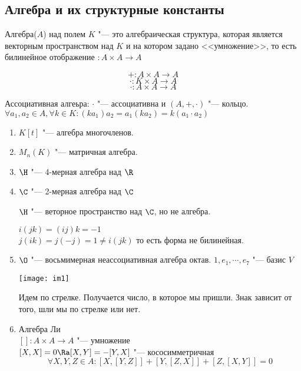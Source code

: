 \subsection{Алгебра и их структурные константы}
\begin{Def}
Алгебра($A$) над полем $K$ "--- это алгебраическая  структура, которая является векторным пространством
над $K$ и на котором задано <<умножение>>, то есть билинейное отображение $\colon A \times A \to A$

$$+ \colon A \times A \to A$$
$$\cdot \colon K \times A \to A$$
$$\cdot \colon A \times A \to A$$

\end{Def}
\begin{Def}
    Ассоциативная алгеьра: $\cdot$ "--- ассоциативна и $(A, +, \cdot)$ "--- кольцо.\\ 
    $\forall a_1, a_2 \in A, \forall k \in K \colon (ka_1)a_2 = a_1(ka_2) = k(a_1 \cdot a_2)$\\
\end{Def}
\begin{exmp}   
    \begin{enumerate}
    \item
    $K[t]$ "--- алгебра многочленов.\\
    \item
    $M_n(K)$ "--- матричная алгебра.\\
    \item
    $\H$ "--- 4-мерная алгебра над $\R$\\
    \item
    $\C$ "--- 2-мерная алгебра над $\C$\\
    \begin{Rem}
    $\H$ "--- веторное пространство над $\C$, но не алгебра. 

    $i(jk) = (ij) k = -1$\\
    $j(ik) = j(-j) = 1 \ne i(jk)$
     то есть форма не билинейная. 
    \end{Rem}
    \item
    $\O$ "--- восьмимерная неассоциативная алгебра октав. 
    $1, e_1, \cdots, e_7$ "--- базис $V$

    \texttt{[image: im1]}
        
    Идем по стрелке. Получается число, в которое мы пришли. Знак зависит от того, шли мы по стрелке или нет. 
    \item Алгебра Ли \\
    $[]\colon A \times A \to A $ "--- умножение\\
    $[X, X] = 0 \Ra [X, Y] = -[Y, X]$ "--- кососимметричная\\
    $$\forall X, Y, Z\in A \colon [X, [Y, Z]] + [Y, [Z, X]] + [Z, [X, Y]] = 0$$
    \end{enumerate}
\end{exmp}

